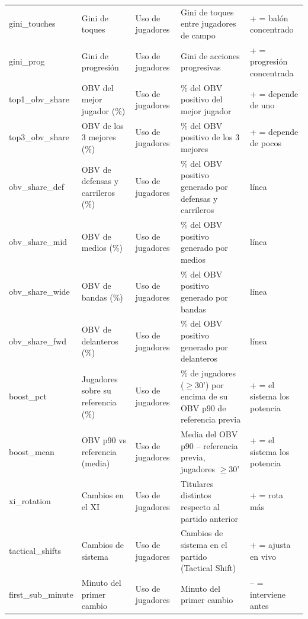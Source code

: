 {\begin{longtable}{p{3.4cm} p{3.3cm} p{2.2cm} p{5.2cm} p{2.6cm}}
gini\_touches & Gini de toques & Uso de jugadores & Gini de toques entre jugadores de campo & + = balón concentrado \\
gini\_prog & Gini de progresión & Uso de jugadores & Gini de acciones progresivas & + = progresión concentrada \\
top1\_obv\_share & OBV del mejor jugador (\%) & Uso de jugadores & \% del OBV positivo del mejor jugador & + = depende de uno \\
top3\_obv\_share & OBV de los 3 mejores (\%) & Uso de jugadores & \% del OBV positivo de los 3 mejores & + = depende de pocos \\
obv\_share\_def & OBV de defensas y carrileros (\%) & Uso de jugadores & \% del OBV positivo generado por defensas y carrileros & línea \\
obv\_share\_mid & OBV de medios (\%) & Uso de jugadores & \% del OBV positivo generado por medios & línea \\
obv\_share\_wide & OBV de bandas (\%) & Uso de jugadores & \% del OBV positivo generado por bandas & línea \\
obv\_share\_fwd & OBV de delanteros (\%) & Uso de jugadores & \% del OBV positivo generado por delanteros & línea \\
boost\_pct & Jugadores sobre su referencia (\%) & Uso de jugadores & \% de jugadores ($\geq$30') por encima de su OBV p90 de referencia previa & + = el sistema los potencia \\
boost\_mean & OBV p90 vs referencia (media) & Uso de jugadores & Media del OBV p90 -- referencia previa, jugadores $\geq$30' & + = el sistema los potencia \\
xi\_rotation & Cambios en el XI & Uso de jugadores & Titulares distintos respecto al partido anterior & + = rota más \\
tactical\_shifts & Cambios de sistema & Uso de jugadores & Cambios de sistema en el partido (Tactical Shift) & + = ajusta en vivo \\
first\_sub\_minute & Minuto del primer cambio & Uso de jugadores & Minuto del primer cambio & -- = interviene antes \\
\end{longtable}
}